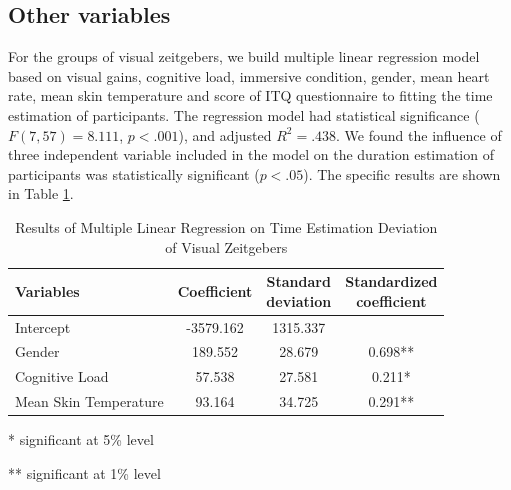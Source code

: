 \documentclass[sigconf]{acmart}
\begin{document}
\subsection*{Other variables}

For the groups of visual zeitgebers, we build multiple linear regression model based on visual gains, cognitive load, immersive condition, gender, mean heart rate, mean skin temperature and score of ITQ questionnaire to fitting the time estimation of participants. The regression model had statistical significance ($F(7,57) = 8.111$, $p < .001$), and adjusted $R^2 = .438$. We found the influence of three independent variable included in the model on the duration estimation of participants was statistically significant ($p < .05$). The specific results are shown in Table \ref{tab:visualtime}.

\begin{table}[htbp] %
 \centering\small
 \begin{threeparttable}
 \caption{Results of Multiple Linear Regression on Time Estimation Deviation of Visual Zeitgebers}
 \label{regression}
  \begin{tabular}{lccc} %
  \toprule %
  Variables         & Coefficient & \makecell[c]{Standard\\ deviation} & \makecell[c]{Standardized\\ coefficient} \\
  \midrule %
  Intercept          & -3579.162 & 1315.337  &         \\
  Gender             & 189.552   & 28.679   & 0.698**  \\
  Cognitive Load & 57.538   & 27.581   & 0.211*  \\
  Mean Skin Temperature & 93.164   & 34.725   & 0.291**  \\
  \bottomrule %
 \end{tabular}
  \label{tab:visualtime}
  \small
 \begin{tablenotes}
  \item[*] significant at 5\% level
  \item[**] significant at 1\% level
 \end{tablenotes}
 \end{threeparttable}
\end{table}
\end{document}
